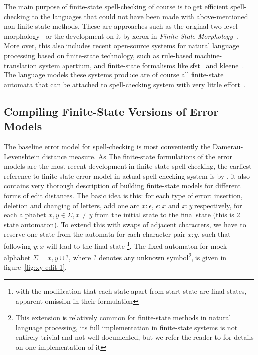 \documentclass[a4paper,12pt]{article}
\begin{document}
The main purpose of finite-state spell-checking of course is to get efficient
spell-checking to the languages that could not have been made with
above-mentioned non-finite-state methods. These are approaches such as the
original two-level morphology~\cite{koskenniemi/1983} or the development
on it by xerox in \emph{Finite-State Morphology}~\cite{beesley2003finite}.
More over, this also includes recent open-source systems for natural language
processing based on finite-state technology, such as rule-based
machine-translation system apertium\cite{apertium2010}, and finite-state
formalisms like sfst~\cite{schmid2006programming} and
kleene~\cite{beesley2012kleene}.  The language models these systems produce are
of course all finite-state automata that can be attached to spell-checking
system with very little effort~\cite[e.g.][]{pirinen2012compiling}.

\subsection{Compiling Finite-State Versions of Error Models}
\label{subsec:error-models}

The baseline error model for spell-checking is most conveniently the
Damerau-Levenshtein distance measure. As The finite-state formulations of the
error models are the most recent development in finite-state spell-checking,
the earliest reference to finite-state error model in actual spell-checking
system is by \cite{schulz/2002}, it also contains very thorough description of
building finite-state models for different forms of edit distances. The basic
idea is this: for each type of error: insertion, deletion and changing of
letters, add one arc $x:\epsilon$, $\epsilon:x$ and $x:y$ respectively, for
each alphabet $x, y \in \Sigma, x \neq y$ from the initial state to the final
state (this is 2 state automaton). To extend this with swaps of adjacent
characters, we have to reserve one state from the automata for each character
pair $x:y$, such that following $y:x$ will lead to the final state
\cite{pirinen/2010/lrec}\footnote{with the modification that each state apart
from start state are final states, apparent omission in their formulation}.
The fixed automaton for mock alphabet $\Sigma = {x, y} \cup {?}$, where $?$
denotes any unknown symbol\footnote{This extension is relatively common for
    finite-state methods in natural language processing, its full
    implementation in finite-state systems is not entirely trivial and not
    well-documented, but we refer the reader to \cite{beesley2003finite} for
    details on one implementation of it}, is given in
    figure~\ref{fig:xy-edit-1}.
\end{document}
